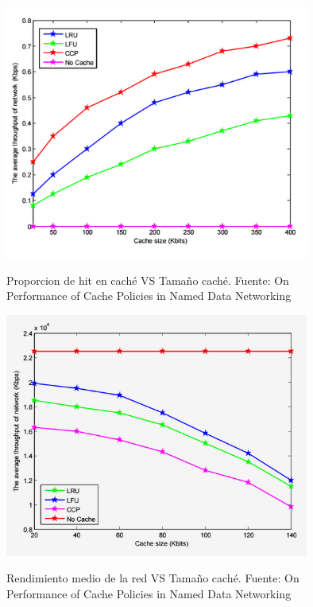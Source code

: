 \documentclass[12pt]{ociamthesis}  %
\begin{document}
\begin{figure}[!htb]
	\centering
	\includegraphics[width=10cm]{Imagenes/Paper1.1/Grafico_cache_hit_vs_size}\\
	\caption{Proporcion de hit en caché VS Tamaño caché. Fuente: On Performance of Cache Policies in Named Data Networking \cite{ran2013performance}}
	\label{hit_vs_size}
\end{figure}

\begin{figure}[!htb]
	\centering
	\includegraphics[width=10cm]{Imagenes/Paper1.1/Grafico_RendimientoRed_vs_cachesize}\\
	\caption{Rendimiento medio de la red VS Tamaño caché. Fuente: On Performance of Cache Policies in Named Data Networking \cite{ran2013performance}}
	\label{RendimientoRed_vs_cssize}
\end{figure}
\end{document}
